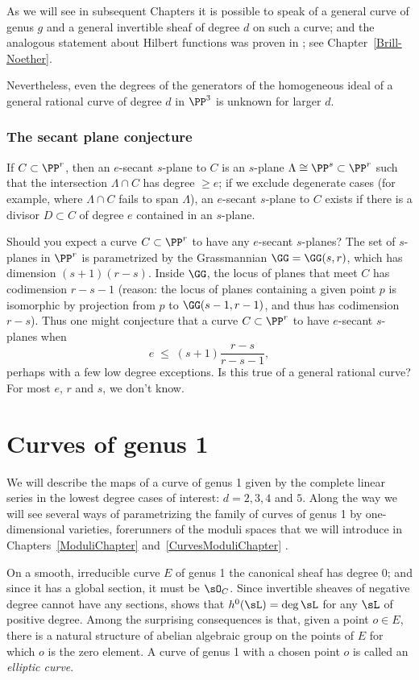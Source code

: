 As we will see in subsequent Chapters it is possible to speak of a general curve of genus $g$
and a general invertible sheaf of degree $d$ on such a curve; and the analogous statement 
about Hilbert functions  was proven in \cite{ELarson2018}; see Chapter~\ref{Brill-Noether}.

Nevertheless, even the degrees of the generators of the homogeneous ideal of a general
rational curve of degree $d$ in $\PP^3$ is unknown for larger $d$. 

\subsubsection{The secant plane conjecture}

If $C \subset \PP^r$, then an $e$-secant $s$-plane to $C$ is an $s$-plane $\Lambda \cong \PP^s \subset \PP^r$ such that the intersection $\Lambda \cap C$ has degree $\geq e$; if we exclude degenerate cases (for example, where $\Lambda \cap C$ fails to span $\Lambda$), an $e$-secant $s$-plane to $C$ exists if there is a divisor $D \subset C$ of degree $e$  contained in an $s$-plane.

Should you expect a curve $C \subset \PP^r$ to have any $e$-secant $s$-planes? The set of $s$-planes in $\PP^r$ is parametrized by the Grassmannian $\GG = \GG(s,r)$, which has dimension $(s+1)(r-s)$. Inside $\GG$, the locus of planes that meet $C$ has codimension $r-s-1$ (reason: the locus of planes containing a given point $p$ is isomorphic
by projection from $p$ to $\GG(s-1,r-1)$, and thus has codimension $r-s$). Thus one might conjecture that a curve $C \subset \PP^r$ to have $e$-secant $s$-planes when 
$$
e \; \leq \; (s+1)\frac{r-s}{r-s-1},
$$
perhaps with a few low degree exceptions. Is this true of a general rational curve? For most $e$, $r$ and $s$, we don't know.

\section{Curves of genus 1}

We will describe the maps of a curve of genus 1 given by
the complete linear series in the lowest degree cases of interest: $d =  2, 3, 4$ and $5$. Along the
way we will see several ways of parametrizing the family of curves of genus 1 by one-dimensional varieties,
forerunners of the moduli spaces that we will introduce in Chapters~\ref{ModuliChapter} and~\ref{CurvesModuliChapter} .


On a smooth, irreducible curve $E$ of genus 1 the canonical sheaf has degree 0; and since it has a global section, it must be $\sO_C$.
Since invertible sheaves of negative degree cannot have any sections, \trr shows that
$h^0( \sL) = \deg \sL$ for any $\sL$ of positive degree. Among the surprising consequences is that, given
a point $o\in E$, there is a natural structure of abelian algebraic group on the points of $E$ for which $o$
is the zero element. A curve of genus 1 with a chosen point $o$ is called an \emph{elliptic curve}.


